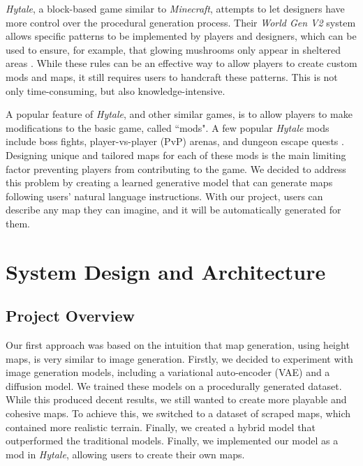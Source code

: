 \documentclass[conference]{IEEEtran}
\begin{document}
\textit{Hytale}, a block-based game similar to \textit{Minecraft}, attempts to let designers have more control over the procedural generation process. Their \textit{World Gen V2} system allows specific patterns to be implemented by players and designers, which can be used to ensure, for example, that glowing mushrooms only appear in sheltered areas \cite{hytale_world_generation_2026}. While these rules can be an effective way to allow players to create custom mods and maps, it still requires users to handcraft these patterns. This is not only time-consuming, but also knowledge-intensive.

A popular feature of \textit{Hytale}, and other similar games, is to allow players to make modifications to the basic game, called ``mods". A few popular \textit{Hytale} mods include boss fights, player-vs-player (PvP) arenas, and dungeon escape quests \cite{curseforge_hytale_2026}. Designing unique and tailored maps for each of these mods is the main limiting factor preventing players from contributing to the game. We decided to address this problem by creating a learned generative model that can generate maps following users' natural language instructions. With our project, users can describe any map they can imagine, and it will be automatically generated for them. 

\section{System Design and Architecture}

\subsection{Project Overview}
Our first approach was based on the intuition that map generation, using height maps, is very similar to image generation. Firstly, we decided to experiment with image generation models, including a variational auto-encoder (VAE) and a diffusion model. We trained these models on a procedurally generated dataset. While this produced decent results, we still wanted to create more playable and cohesive maps. To achieve this, we switched to a dataset of scraped maps, which contained more realistic terrain. Finally, we created a hybrid model that outperformed the traditional models. Finally, we implemented our model as a mod in \textit{Hytale}, allowing users to create their own maps.
\end{document}

